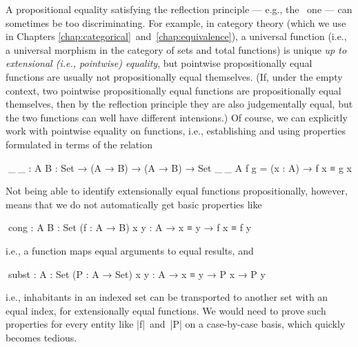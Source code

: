 A propositional equality satisfying the reflection principle --- e.g., the \Agda\ one --- can sometimes be too discriminating.
For example, in category theory (which we use in Chapters \ref{chap:categorical}~and~\ref{chap:equivalence}), a universal function (i.e., a universal morphism in the category of sets and total functions) is unique \emph{up to extensional (i.e., pointwise) equality}, but pointwise propositionally equal functions are usually not propositionally equal themselves.
(If, under the empty context, two pointwise propositionally equal functions are propositionally equal themselves, then by the reflection principle they are also judgementally equal, but the two functions can well have different intensions.)
Of course, we can explicitly work with pointwise equality on functions, i.e., establishing and using properties formulated in terms of the relation
\begin{code}
^^^_≐_ : {A B : Set} → (A → B) → (A → B) → Set
_≐_ {A} f g = (x : A) → f x ≡ g x
\end{code}
Not being able to identify extensionally equal functions propositionally, however, means that we do not automatically get basic properties like
\begin{code}
^^^cong : {A B : Set} (f : A → B) {x y : A} → x ≡ y → f x ≡ f y
\end{code}
i.e., a function maps equal arguments to equal results, and
\begin{code}
^^^subst : {A : Set} (P : A → Set) {x y : A} → x ≡ y → P x → P y
\end{code}
i.e., inhabitants in an indexed set can be transported to another set with an equal index, for extensionally equal functions.
We would need to prove such properties for every entity like |f|~and~|P| on a case-by-case basis, which quickly becomes tedious.

